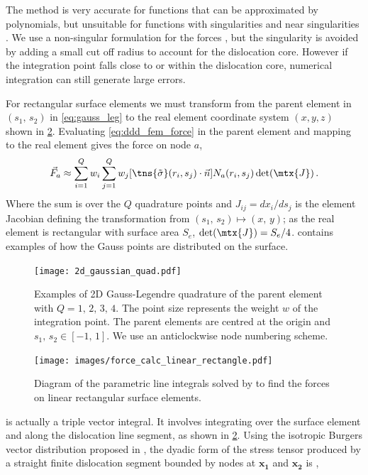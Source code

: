 \documentclass[11pt]{iopart}
\begin{document}
The method is very accurate for functions that can be approximated by polynomials, but unsuitable for functions with singularities and near singularities \cite{gauss_leg, gauss_leg_sing}. We use a non-singular formulation for the forces \cite{Cai2006}, but the singularity is avoided by adding a small cut off radius to account for the dislocation core. However if the integration point falls close to or within the dislocation core, numerical integration can still generate large errors.

For rectangular surface elements we must transform from the parent element in $(s_1,\,s_2)$ in \cref{eq:gauss_leg} to the real element coordinate system $(x,y,z)$ shown in \cref{f:force_lin_rect}. Evaluating \cref{eq:ddd_fem_force} in the parent element and mapping to the real element gives the force on node $a$,
\begin{align}
    \label{eq:gauss_leg_ddd_fem_force}
    \vec{F}_{a} \approx \sum\limits_{i=1}^{Q} w_{i} \sum\limits_{j=1}^{Q} w_{j} [\tns{\tilde{\sigma}}(r_{i}, s_{j})\cdot \vec{n}] N_{a}(r_{i}, s_{j}) \det(\mtx{J})\,.
\end{align}
Where the sum is over the $Q$ quadrature points and $J_{ij}=dx_{i}/ds_{j}$ is the element Jacobian defining the transformation from $(s_1,\,s_2) \mapsto (x,\,y)$; as the real element is rectangular with surface area $S_e$, $\det(\mtx{J})=S_e/4$.  contains examples of how the Gauss points are distributed on the surface.
\begin{figure}
    \centering
    \texttt{[image: 2d\_gaussian\_quad.pdf]}
    \caption{Examples of 2D Gauss-Legendre quadrature of the parent element with $Q = 1,\, 2,\, 3,\, 4$. The point size represents the weight $w$ of the integration point. The parent elements are centred at the origin and $s_1,\, s_2 \in [-1,\,1]$. We use an anticlockwise node numbering scheme.}
    \label{f:2d_gaussian_quad}
\end{figure}
\begin{figure}
    \centering
    \texttt{[image: images/force\_calc\_linear\_rectangle.pdf]}
    \caption{Diagram of the parametric line integrals solved by \citet{Queyreau} to find the forces on linear rectangular surface elements.}
    \label{f:force_lin_rect}
\end{figure}
 is actually a triple vector integral. It involves integrating over the surface element and along the dislocation line segment, as shown in \cref{f:force_lin_rect}. Using the isotropic Burgers vector distribution proposed in \cite{Cai2006}, the dyadic form of the stress tensor produced by a straight finite dislocation segment bounded by nodes at $\mathbf{x_1}$ and $\mathbf{x_2}$ is \cite{Queyreau},
\end{document}
